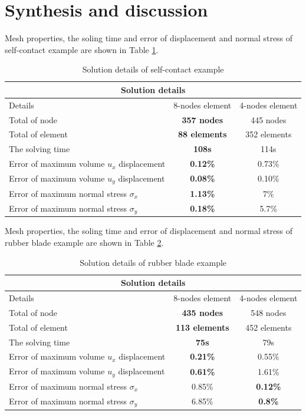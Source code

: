 \section{Synthesis and discussion}
Mesh properties, the soling time and error of displacement and normal stress of self-contact example are shown in Table \ref{tab:sd_s}.
\begin{table}[H]
    \centering
    \begin{tabular}{|l|c|c|}
    \multicolumn{3}{c}{Solution details} \\ \hline
        Details             & 8-nodes element & 4-nodes element  \\ \hline
        Total of node       &{\bf 357 nodes} &445 nodes    \\ \hline
        Total of element    & {\bf 88 elements} &352 elements      \\ \hline
        The solving time    &{\bf 108s}      &       114s      \\ \hline
        Error of maximum volume $u_x$ displacement&{\bf 0.12\%} &0.73\% \\ \hline
        Error of maximum volume $u_y$ displacement&{\bf 0.08\%} &0.10\% \\ \hline
        Error of maximum normal stress $\sigma_x$ &{\bf 1.13\%}&7\% \\ \hline
        Error of maximum normal stress $\sigma_y$ &{\bf 0.18\%}&5.7\% \\ \hline
    \end{tabular}
    \caption{Solution details of self-contact example}
    \label{tab:sd_s}
\end{table}
\noindent
Mesh properties, the soling time and error of displacement and normal stress of rubber blade example are shown in Table \ref{tab:sd_r}.
\begin{table}[H]
    \centering
    \begin{tabular}{|l|c|c|}
    \multicolumn{3}{c}{Solution details} \\ \hline
        Details             & 8-nodes element & 4-nodes element  \\ \hline
        Total of node       &{\bf 435 nodes} &548 nodes    \\ \hline
        Total of element    & {\bf 113 elements} &452 elements      \\ \hline
        The solving time    &{\bf 75s}      &       79s      \\ \hline
        Error of maximum volume $u_x$ displacement&{\bf 0.21\%} &0.55\% \\ \hline
        Error of maximum volume $u_y$ displacement&{\bf 0.61\%} &1.61\% \\ \hline
        Error of maximum normal stress $\sigma_x$ &0.85\%&{\bf 0.12\%} \\ \hline
        Error of maximum normal stress $\sigma_y$ & 6.85\%&{\bf 0.8\%} \\ \hline
    \end{tabular}
    \caption{Solution details of rubber blade example}
    \label{tab:sd_r}
\end{table}
